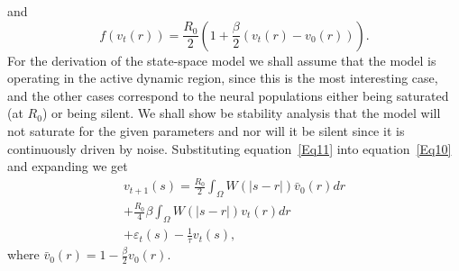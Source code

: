 \documentclass[onecolumn,draftcls]{IEEEtran}
\begin{document}
and
\begin{equation}\label{Eq12}
f\left( {{v_t}\left( r \right)} \right) = \frac{{{R_0}}}{2}\left( {1 + \frac{\beta }{2}\left( {{v_t}\left( r \right) - {v_0}\left( r \right)} \right)} \right).
\end{equation}
For the derivation of the state-space model we shall assume that the model is operating in the active dynamic region, since this is the most interesting case, and the other cases correspond to the neural populations either being saturated (at $R_0$) or being silent. We shall show be stability analysis that the model will not saturate for the given parameters and nor will it be silent since it is continuously driven by noise. Substituting equation~\ref{Eq11} into equation~\ref{Eq10} and expanding we get
\begin{align}\label{Eq13}
 {v_{t + 1}}\left( s \right) = \frac{{{R_0}}}{2}\int_\Omega  {W\left( {\left| {s - r} \right|} \right){{\bar v}_0}\left( r \right)dr}  \nonumber \\
  + \frac{{{R_0}}}{4}\beta \int_\Omega  {W\left( {\left| {s - r} \right|} \right){v_t}\left( r \right)dr}  \\
  + {\varepsilon _t}\left( s \right) - \frac{1}{\tau }{v_t}\left( s \right), \nonumber
\end{align}
where ${\bar v_0}\left( r \right) = 1 - \frac{\beta }{2}{v_0}\left( r \right)$.
\end{document}

